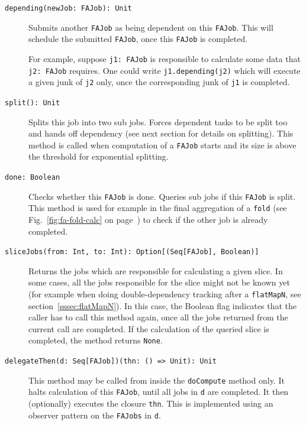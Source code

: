 \documentclass[runningheads,a4paper,fleqn]{llncs}
\begin{document}
\begin{description}
  \item[\texttt{depending(newJob: FAJob): Unit}] Submits another \texttt{FAJob} as being
    dependent on this \texttt{FAJob}. This will schedule the submitted
    \texttt{FAJob}, once this \texttt{FAJob} is completed.

    For example, suppose \texttt{j1: FAJob} is responsible to
    calculate some data that \texttt{j2: FAJob} requires. One
    could write \verb|j1.depending(j2)| which will execute a given
    junk of \texttt{j2} only, once the corresponding junk of
    \texttt{j1} is completed.
  \item[\texttt{split(): Unit}] Splits this job into two
    sub jobs. Forces dependent tasks to be split too and hands off
    dependency (see next section for details on splitting). This
    method is called when computation of a \texttt{FAJob} starts and
    its size is above the threshold for exponential splitting.
  \item[\texttt{done: Boolean}] Checks whether this \texttt{FAJob} is
    done. Queries sub jobs if this \texttt{FAJob} is split. This
    method is used for example in the final aggregation of a
    \texttt{fold} (see Fig.~\ref{fig:fa-fold-calc} on
    page~\pageref{fig:fa-fold-calc}) to check if the other job is
    already completed.
  \item[\texttt{sliceJobs(from: Int, to: Int): Option[(Seq[FAJob],
      Boolean)]}] Returns the jobs which are responsible for
    calculating a given slice. In some cases, all the jobs responsible
    for the slice might not be known yet (for example when doing
    double-dependency tracking after a \texttt{flatMapN}, see
    section~\ref{sssec:flatMapN}). In this case, the Boolean flag
    indicates that the caller has to call this method again, once all
    the jobs returned from the current call are completed. If the
    calculation of the queried slice is completed, the method returns
    \texttt{None}.
  \item[\texttt{delegateThen(d: Seq[FAJob])(thn: () => Unit): Unit}]
    This method may be called from inside the \texttt{doCompute}
    method only. It halts calculation of this \texttt{FAJob}, until
    all jobs in \texttt{d} are completed. It then (optionally)
    executes the closure \texttt{thn}. This is implemented using an
    observer pattern on the \texttt{FAJobs} in \texttt{d}.
\end{description}
\end{document}
